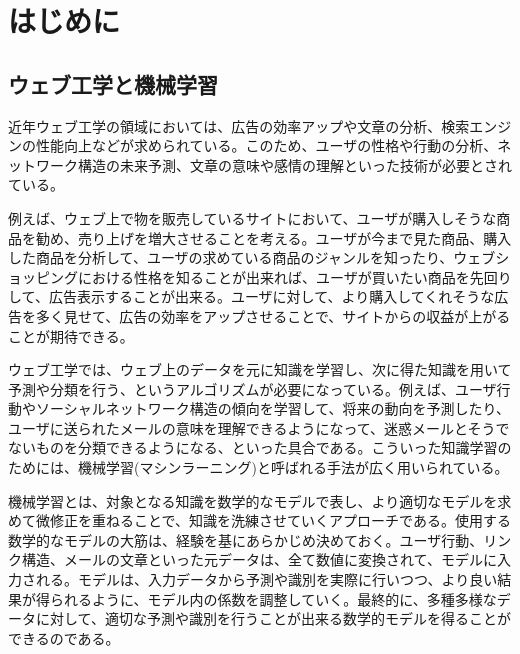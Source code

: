 \chapter{はじめに}
\label{chap:preface}
\section{ウェブ工学と機械学習}
近年ウェブ工学の領域においては、広告の効率アップや文章の分析、検索エンジンの性能向上などが求められている。このため、ユーザの性格や行動の分析、ネットワーク構造の未来予測、文章の意味や感情の理解といった技術が必要とされている。\par
例えば、ウェブ上で物を販売しているサイトにおいて、ユーザが購入しそうな商品を勧め、売り上げを増大させることを考える。ユーザが今まで見た商品、購入した商品を分析して、ユーザの求めている商品のジャンルを知ったり、ウェブショッピングにおける性格を知ることが出来れば、ユーザが買いたい商品を先回りして、広告表示することが出来る。ユーザに対して、より購入してくれそうな広告を多く見せて、広告の効率をアップさせることで、サイトからの収益が上がることが期待できる。\par
ウェブ工学では、ウェブ上のデータを元に知識を学習し、次に得た知識を用いて予測や分類を行う、というアルゴリズムが必要になっている。例えば、ユーザ行動やソーシャルネットワーク構造の傾向を学習して、将来の動向を予測したり、ユーザに送られたメールの意味を理解できるようになって、迷惑メールとそうでないものを分類できるようになる、といった具合である。こういった知識学習のためには、機械学習(マシンラーニング)と呼ばれる手法が広く用いられている。\par
機械学習とは、対象となる知識を数学的なモデルで表し、より適切なモデルを求めて微修正を重ねることで、知識を洗練させていくアプローチである。使用する数学的なモデルの大筋は、経験を基にあらかじめ決めておく。ユーザ行動、リンク構造、メールの文章といった元データは、全て数値に変換されて、モデルに入力される。モデルは、入力データから予測や識別を実際に行いつつ、より良い結果が得られるように、モデル内の係数を調整していく。最終的に、多種多様なデータに対して、適切な予測や識別を行うことが出来る数学的モデルを得ることができるのである。

